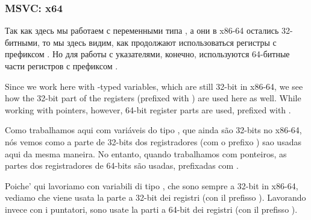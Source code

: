 \subsubsection{MSVC: x64}


\ifdefined\RUSSIAN
Так как здесь мы работаем с переменными типа \Tint, а они в x86-64 остались 32-битными, то мы здесь видим, как продолжают использоваться регистры с префиксом .
Но для работы с указателями, конечно, используются 64-битные части регистров с префиксом .


\fi

\ifdefined\ENGLISH
Since we work here with \Tint{}-typed variables, which are still 32-bit in x86-64, we see how the 32-bit part of the registers (prefixed with ) are used here as well.
While working with pointers, however, 64-bit register parts are used, prefixed with .


\fi

\ifdefined\BRAZILIAN
Como trabalhamos aqui com variáveis do tipo \Tint, que ainda são 32-bits no x86-64, nós vemos como a parte de 32-bits dos registradores (com o prefixo ) sao usadas aqui da mesma maneira.
No entanto, quando trabalhamos com ponteiros, as partes dos registradores de 64-bits são usadas, prefixadas com .


\fi

\ifdefined\ITALIAN
Poiche' qui lavoriamo con variabili di tipo \Tint{}, che sono sempre a 32-bit in x86-64, vediamo che viene usata la parte a 32-bit dei registri (con il prefisso ).
Lavorando invece con i puntatori, sono usate la parti a 64-bit dei registri (con il prefisso ).


\fi